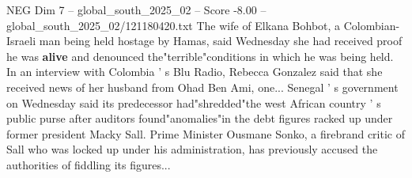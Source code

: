 \begin{textsample}{NEG Dim 7 – global\_south\_2025\_02 – Score -8.00 – global\_south\_2025\_02/121180420.txt}
The wife of Elkana Bohbot, a Colombian-Israeli man being held hostage by Hamas, said Wednesday she had received proof he was \textbf{alive} and denounced the"terrible"conditions in which he was being held.
In an interview with Colombia ' s Blu Radio, Rebecca Gonzalez said that she received news of her husband from Ohad Ben Ami, one...
Senegal ' s government on Wednesday said its predecessor had"shredded"the west African country ' s public purse after auditors found"anomalies"in the debt figures racked up under former president Macky Sall.
Prime Minister Ousmane Sonko, a firebrand critic of Sall who was locked up under his administration, has previously accused the authorities of fiddling its figures...

\end{textsample}
